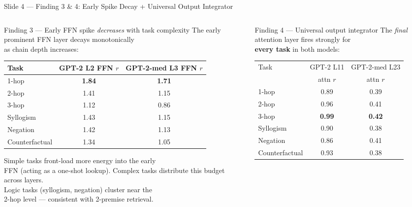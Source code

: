 \documentclass[aspectratio=169,10pt]{beamer}
\newcommand{\hi}[1] {\textcolor{attnred}{\textbf{#1}}}
\begin{document}
\begin{frame}{Slide 4 — Finding 3 \& 4: Early Spike Decay + Universal Output Integrator}

\begin{columns}[T]

\begin{column}{0.50\textwidth}
\begin{block}{Finding 3 — Early FFN spike \emph{decreases} with task complexity}
\footnotesize
The early prominent FFN layer decays monotonically\\
as chain depth increases:

\medskip
\begin{tabular}{lcc}
\toprule
Task & GPT-2 L2 FFN $r$ & GPT-2-med L3 FFN $r$ \\
\midrule
1-hop     & \hi{1.84} & \hi{1.71} \\
2-hop     & 1.41      & 1.15 \\
3-hop     & 1.12      & 0.86 \\
Syllogism & 1.43      & 1.15 \\
Negation  & 1.42      & 1.13 \\
Counterfactual & 1.34 & 1.05 \\
\bottomrule
\end{tabular}

\medskip
Simple tasks front-load more energy into the early\\
FFN (acting as a one-shot lookup).
Complex tasks distribute this budget across layers.\\[4pt]
Logic tasks (syllogism, negation) cluster near the\\
2-hop level — consistent with 2-premise retrieval.
\end{block}
\end{column}

\begin{column}{0.46\textwidth}
\begin{block}{Finding 4 — Universal output integrator}
\footnotesize
The \emph{final} attention layer fires strongly for\\
\textbf{every task} in both models:

\medskip
\begin{tabular}{lcc}
\toprule
Task & GPT-2 L11 & GPT-2-med L23 \\
     & attn $r$  & attn $r$ \\
\midrule
1-hop     & 0.89 & 0.39 \\
2-hop     & 0.96 & 0.41 \\
3-hop     & \hi{0.99} & \hi{0.42} \\
Syllogism & 0.90 & 0.38 \\
Negation  & 0.86 & 0.41 \\
Counterfactual & 0.93 & 0.38 \\
\bottomrule
\end{tabular}


\end{block}
\end{column}
\end{columns}
\end{frame}
\end{document}
